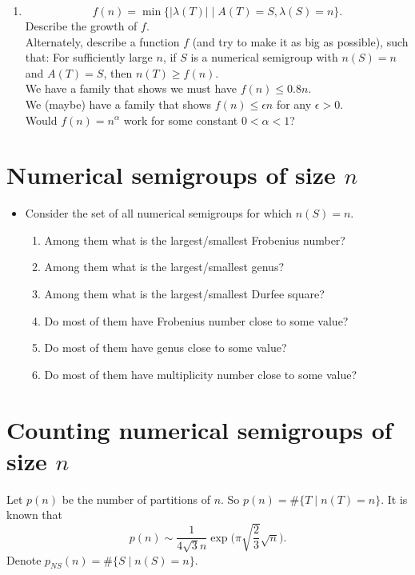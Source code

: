 \documentclass{article}
\theoremstyle{definition}
\theoremstyle{definition}
\theoremstyle{definition}
\begin{document}
\begin{itemize}
\begin{enumerate}
        \item 
        \[f(n)=\min\{|\lambda(T)|\mid A(T)=S, \lambda(S)=n\}.\]
        Describe the growth of $f$.\\
        Alternately, describe a function $f$ (and try to make it as big as possible), such that:
        For sufficiently large $n$, if $S$ is a numerical semigroup with $n(S)=n$ and $A(T)=S$, then $n(T)\geq f(n)$.\\
        We have a family that shows we must have $f(n)\leq 0.8 n$.\\
        We (maybe) have a family that shows $f(n)\leq \epsilon n$ for any $\epsilon>0$.\\
        Would $f(n)=n^\alpha$ work for some constant $0<\alpha<1$?
    \end{enumerate}
\end{itemize}


\section{Numerical semigroups of size $n$}

\begin{itemize}
    \item Consider the set of all numerical semigroups for which $n(S)=n$.
\begin{enumerate}
    \item Among them what is the largest/smallest Frobenius number?
    \item Among them what is the largest/smallest genus?
    \item Among them what is the largest/smallest Durfee square?
    \item Do most of them have Frobenius number close to some value?
    \item Do most of them have genus close to some value?
    \item Do most of them have multiplicity number close to some value?
\end{enumerate}




\end{itemize}









\section{Counting numerical semigroups of size $n$}
Let $p(n)$ be the number of partitions of $n$. So $p(n)=\#\{T\mid n(T)=n\}$. It is known that
\[p(n)\sim \frac{1}{4\sqrt{3} n}\exp\Big(\pi\sqrt{\frac{2}{3}}\sqrt{n}\Big).\]
Denote $p_{NS}(n)=\#\{S\mid n(S)=n\}$.
\end{document}
